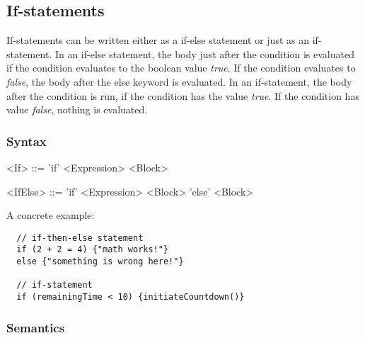 \subsection{If-statements}
\label{subsec:ifStatements}

If-statements can be written either as a if-else statement or just as an if-statement. In an if-else statement, the body just after the condition is evaluated if the condition evaluates to the boolean value \emph{true}. If the condition evaluates to \emph{false}, the body after the else keyword is evaluated. In an if-statement, the body after the condition is run, if the condition has the value \emph{true}. If the condition has value \emph{false}, nothing is evaluated.

\subsubsection{Syntax}

\begin{grammar}
<If> ::= 'if' <Expression> <Block>

<IfElse> ::= 'if' <Expression> <Block> 'else' <Block>
\end{grammar}

A concrete example:

\begin{verbatim}
  // if-then-else statement
  if (2 + 2 = 4) {"math works!"}
  else {"something is wrong here!"}

  // if-statement
  if (remainingTime < 10) {initiateCountdown()}
\end{verbatim}

\subsubsection{Semantics}

